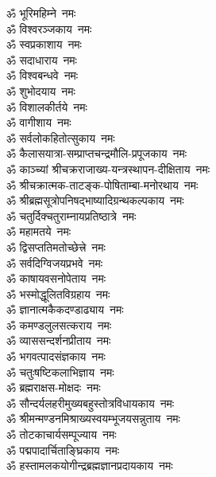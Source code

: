 \begin{multicols}{2}
\begin{flushleft}
        ॐ भूरिमहिम्ने~नमः\\
        ॐ विश्वरञ्जकाय~नमः\\
        ॐ स्वप्रकाशाय~नमः\\
        ॐ सदाधाराय~नमः\\
        ॐ विश्वबन्धवे~नमः\\
        ॐ शुभोदयाय~नमः\\
        ॐ विशालकीर्तये~नमः\\
        ॐ वागीशाय~नमः\\
        ॐ सर्वलोकहितोत्सुकाय~नमः\\
        ॐ कैलासयात्रा-सम्प्राप्त\-चन्द्र\-मौलि-प्रपूजकाय~नमः\hfill{}\\
                                        
        ॐ काञ्च्यां श्रीचक्रराजाख्य-यन्त्रस्थापन-दीक्षिताय~नमः\\
        ॐ श्रीचक्रात्मक-ताटङ्क-पोषिताम्बा-मनोरथाय~नमः\\
        ॐ श्रीब्रह्मसूत्रोपनिषद्\-भाष्यादि\-ग्रन्थ\-कल्पकाय~नमः\\
        ॐ चतुर्दिक्चतुराम्नायप्रतिष्ठात्रे~नमः\\
        ॐ महामतये~नमः\\
        ॐ द्विसप्ततिमतोच्छेत्त्रे~नमः\\
        ॐ सर्वदिग्विजयप्रभवे~नमः\\
        ॐ काषायवसनोपेताय~नमः\\
        ॐ भस्मोद्धूलितविग्रहाय~नमः\\
        ॐ ज्ञानात्मकैकदण्डाढ्याय~नमः\hfill{}\\
        
        ॐ कमण्डलुलसत्कराय~नमः\\
        ॐ व्याससन्दर्शनप्रीताय~नमः\\
        ॐ भगवत्पादसंज्ञकाय~नमः\\
        ॐ चतुःषष्टिकलाभिज्ञाय~नमः\\
        ॐ ब्रह्मराक्षस-मोक्षदः~नमः\\
        ॐ सौन्दर्यलहरी\-मुख्य\-बहु\-स्तोत्र\-विधाय\-काय~नमः\\
        ॐ श्रीमन्मण्डन\-मिश्राख्य\-स्वयम्भू\-जय\-सन्नुताय~नमः\\
        ॐ तोटकाचार्यसम्पूज्याय~नमः\\
        ॐ पद्मपादार्चिताङ्घ्रिकाय~नमः\\
        ॐ हस्तामलक\-योगीन्द्र\-ब्रह्म\-ज्ञान\-प्रदायकाय~नमः\hfill{}\\


\end{flushleft}
\end{multicols}
